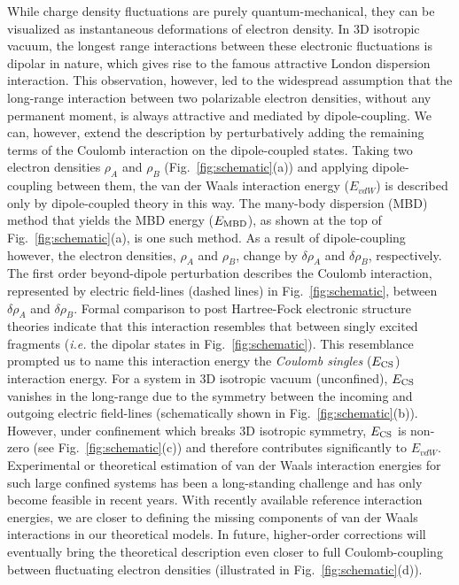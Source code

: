 \documentclass[aps,prl,groupaddress, twocolumn]{revtex4-1}
\begin{document}
While charge density fluctuations are purely quantum-mechanical, they can be visualized as instantaneous deformations of electron density. In 3D isotropic vacuum, the longest range interactions between these electronic fluctuations is dipolar in nature, which gives rise to the famous attractive London dispersion interaction. This observation, however, led to the widespread assumption that the long-range interaction between two polarizable electron densities, without any permanent moment, is always attractive and mediated by dipole-coupling. We can, however, extend the description by perturbatively adding the remaining terms of the Coulomb interaction on the dipole-coupled states\cite{sadhukhan_prl_2017}. Taking two electron densities $\rho_A$ and $\rho_B$ (Fig.~\ref{fig:schematic}(a)) and applying dipole-coupling between them, the van der Waals interaction energy ($E_{vdW}$) is described only by dipole-coupled theory in this way. The many-body dispersion (MBD) method that yields the MBD energy ($E_{\rm MBD}$), as shown at the top of Fig.~\ref{fig:schematic}(a), is one such method. As a result of dipole-coupling however, the electron densities, $\rho_A$ and $\rho_B$, change by $\delta \rho_A$ and $\delta \rho_B$, respectively. The first order beyond-dipole perturbation describes the Coulomb interaction, represented by electric field-lines (dashed lines) in Fig.~\ref{fig:schematic}, between $\delta \rho_A$ and $\delta \rho_B$. Formal comparison to post Hartree-Fock electronic structure theories indicate that this interaction resembles that between singly excited fragments (\textit{i.e.} the dipolar states in Fig.~\ref{fig:schematic}). This resemblance prompted us to name this interaction energy the \textit{Coulomb singles} ($E_{\rm CS}$) interaction energy. For a system in 3D isotropic vacuum (unconfined), $E_{\rm CS}$ vanishes in the long-range due to the symmetry between the incoming and outgoing electric field-lines (schematically shown in Fig.~\ref{fig:schematic}(b)). However, under confinement which breaks 3D isotropic symmetry, $E_{\rm CS}$ is non-zero (see Fig.~\ref{fig:schematic}(c)) and therefore contributes significantly to $E_{vdW}$. Experimental or theoretical estimation of van der Waals interaction energies for such large confined systems has been a long-standing challenge and has only become feasible in recent years. With recently available reference interaction energies, we are closer to defining the missing components of van der Waals interactions in our theoretical models. In future, higher-order corrections will eventually bring the theoretical description even closer to full Coulomb-coupling between fluctuating electron densities (illustrated in Fig.~\ref{fig:schematic}(d)).
\end{document}
